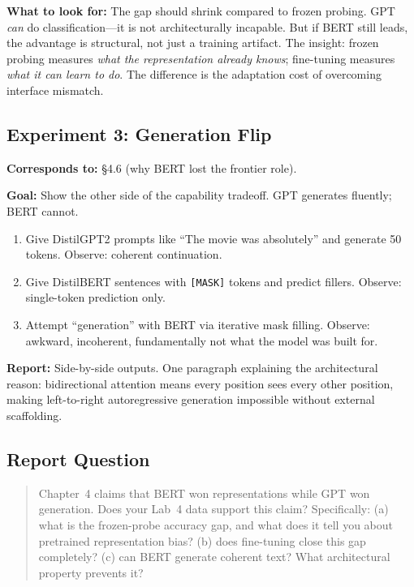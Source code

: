 \textbf{What to look for:} The gap should shrink compared to frozen probing. GPT \emph{can} do classification---it is not architecturally incapable. But if BERT still leads, the advantage is structural, not just a training artifact. The insight: frozen probing measures \emph{what the representation already knows}; fine-tuning measures \emph{what it can learn to do}. The difference is the adaptation cost of overcoming interface mismatch.

\subsection*{Experiment 3: Generation Flip}

\textbf{Corresponds to:} \S4.6 (why BERT lost the frontier role).

\textbf{Goal:} Show the other side of the capability tradeoff. GPT generates fluently; BERT cannot.

\begin{enumerate}[nosep]
    \item Give DistilGPT2 prompts like ``The movie was absolutely'' and generate 50 tokens. Observe: coherent continuation.
    \item Give DistilBERT sentences with \texttt{[MASK]} tokens and predict fillers. Observe: single-token prediction only.
    \item Attempt ``generation'' with BERT via iterative mask filling. Observe: awkward, incoherent, fundamentally not what the model was built for.
\end{enumerate}

\textbf{Report:} Side-by-side outputs. One paragraph explaining the architectural reason: bidirectional attention means every position sees every other position, making left-to-right autoregressive generation impossible without external scaffolding.

\subsection*{Report Question}

\begin{quote}
Chapter~4 claims that BERT won representations while GPT won generation. Does your Lab~4 data support this claim? Specifically: (a) what is the frozen-probe accuracy gap, and what does it tell you about pretrained representation bias? (b) does fine-tuning close this gap completely? (c) can BERT generate coherent text? What architectural property prevents it?
\end{quote}



